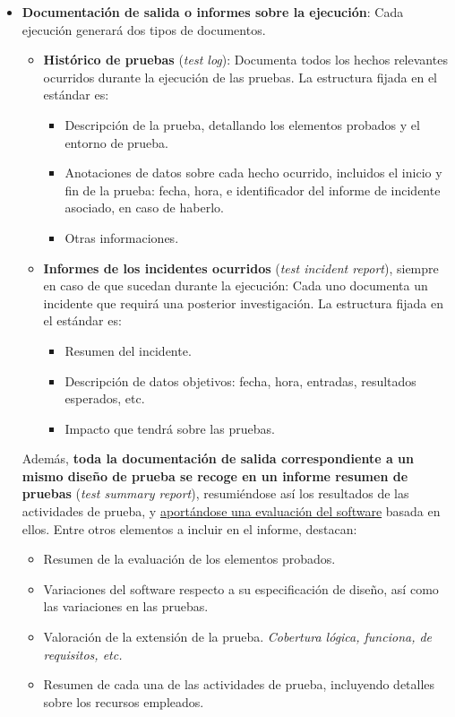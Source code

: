 \begin{itemize}
    \item \textbf{Documentación de salida o informes sobre la ejecución}: Cada ejecución generará dos tipos de documentos.
    \begin{itemize}
        \item \textbf{Histórico de pruebas} (\textit{test log}): Documenta todos los hechos relevantes ocurridos durante la ejecución de las pruebas. La estructura fijada en el estándar es:
        \begin{itemize}
            \item Descripción de la prueba, detallando los elementos probados y el entorno de prueba.
            \item Anotaciones de datos sobre cada hecho ocurrido, incluidos el inicio y fin de la prueba: fecha, hora, e identificador del informe de incidente asociado, en caso de haberlo.
            \item Otras informaciones.
        \end{itemize}
        \item \textbf{Informes de los incidentes ocurridos} (\textit{test incident report}), siempre en caso de que sucedan durante la ejecución: Cada uno documenta un incidente que requirá una posterior investigación. La estructura fijada en el estándar es:
        \begin{itemize}
            \item Resumen del incidente.
            \item Descripción de datos objetivos: fecha, hora, entradas, resultados esperados, etc.
            \item Impacto que tendrá sobre las pruebas.
        \end{itemize}
    \end{itemize}
    Además, \textbf{toda la documentación de salida correspondiente a un mismo diseño de prueba se recoge en un informe resumen de pruebas} (\textit{test summary report}), resumiéndose así los resultados de las actividades de prueba, y \uline{aportándose una evaluación del software} basada en ellos. Entre otros elementos a incluir en el informe, destacan:
    \begin{itemize}
        \item Resumen de la evaluación de los elementos probados.
        \item Variaciones del software respecto a su especificación de diseño, así como las variaciones en las pruebas.
        \item Valoración de la extensión de la prueba. \textit{Cobertura lógica, funciona, de requisitos, etc.}
        \item Resumen de cada una de las actividades de prueba, incluyendo detalles sobre los recursos empleados.
    \end{itemize} 
\end{itemize}

